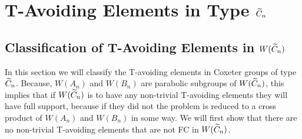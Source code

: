 \chapter{T-Avoiding Elements in Type $\widetilde{C}_n$}\label{chap:Cn}



\section{Classification of T-Avoiding Elements in $W(\widetilde{C}_n)$}

In this section we will classify the T-avoiding elements in Coxeter groups of type $\widetilde{C}_n$. Because, $W(A_n)$ and $W(B_n)$ are parabolic subgroups of $W(\widetilde{C}_n)$, this implies that if $W(\widetilde{C}_n)$ is to have any non-trivial T-avoiding elements they will have full support, because if they did not the problem is reduced to a cross product of $W(A_n)$ and $W(B_n)$ in some way. We will first show that there are no non-trivial T-avoiding elements that are not FC in $W(\widetilde{C}_n)$.

